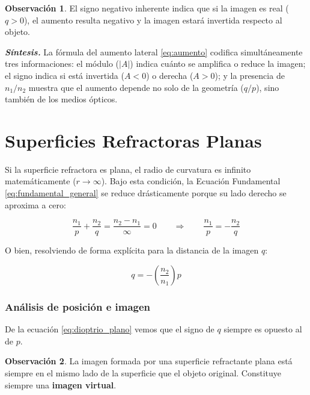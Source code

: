 \documentclass[12pt, a4paper]{article}
\theoremstyle{definition}
\newtheorem{observacion}{Observación}[section]
\begin{document}
\begin{observacion}
El signo negativo inherente indica que si la imagen es real (\(q > 0\)), el aumento resulta
negativo y la imagen estará invertida respecto al objeto.
\end{observacion}

\textit{\textbf{Síntesis.}} La fórmula del aumento lateral \eqref{eq:aumento} codifica
simultáneamente tres informaciones: el módulo (\(|A|\)) indica cuánto se amplifica o
reduce la imagen; el signo indica si está invertida (\(A < 0\)) o derecha (\(A > 0\)); y
la presencia de \(n_1/n_2\) muestra que el aumento depende no solo de la geometría
(\(q/p\)), sino también de los medios ópticos.

\section{Superficies Refractoras Planas}

Si la superficie refractora es plana, el radio de curvatura es infinito matemáticamente
(\(r \to \infty\)). Bajo esta condición, la Ecuación Fundamental \eqref{eq:fundamental_general}
se reduce drásticamente porque su lado derecho se aproxima a cero:

\[
  \frac{n_1}{p} + \frac{n_2}{q} = \frac{n_2 - n_1}{\infty} = 0
  \qquad\Longrightarrow\qquad \frac{n_1}{p} = -\frac{n_2}{q}
\]

O bien, resolviendo de forma explícita para la distancia de la imagen \(q\):

\begin{equation}
  \boxed{q = -\left(\frac{n_2}{n_1}\right)p}
  \label{eq:dioptrio_plano}
\end{equation}

\subsubsection*{Análisis de posición e imagen}

De la ecuación \eqref{eq:dioptrio_plano} vemos que el signo de \(q\) siempre es opuesto
al de \(p\).

\begin{observacion}
La imagen formada por una superficie refractante plana está siempre en el mismo lado de la
superficie que el objeto original. Constituye siempre una \textbf{imagen virtual}.
\end{observacion}
\end{document}
